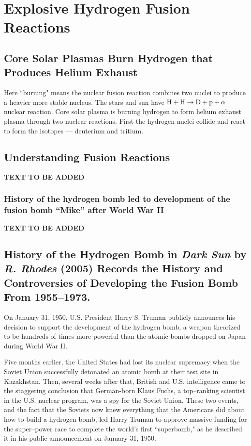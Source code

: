 \documentclass[a4paper,openany,12pt]{book}
\begin{document}
\chapter{Explosive Hydrogen Fusion Reactions}
\section{Core Solar Plasmas Burn Hydrogen that Produces Helium Exhaust}

Here ``burning" means the nuclear fusion reaction combines two nuclei to produce a heavier more stable nucleus. The stars and sun have $\rm H+H\to D+p+\alpha$ nuclear reaction. Core solar plasma is burning hydrogen to form helium exhaust plasma through two nuclear reactions. First the hydrogen nuclei collide and react to form the isotopes --- deuterium and tritium.
%
\section{Understanding Fusion Reactions}

\textbf{TEXT TO BE ADDED}

\subsection{History of the hydrogen bomb led to development of the fusion bomb ``Mike'' after World War II}

\textbf{TEXT TO BE ADDED}
%
\section[History of the Hydrogen Bomb in \emph{\textbf{Dark Sun}}]{History of the Hydrogen Bomb in \emph{\textbf{Dark Sun}} by \emph{\textbf{R. Rhodes}} (2005) Records the History and Controversies of Developing the Fusion Bomb From 1955--1973.}

On January 31, 1950, U.S. President Harry S. Truman publicly announces his decision to support the development of the hydrogen bomb, a weapon theorized to be hundreds of times more powerful than the atomic bombs dropped on Japan during World War II.

Five months earlier, the United States had lost its nuclear supremacy when the Soviet Union successfully detonated an atomic bomb at their test site in Kazakhstan. Then, several weeks after that, British and U.S. intelligence came to the staggering conclusion that German-born Klaus Fuchs, a top--ranking scientist in the U.S. nuclear program, was a spy for the Soviet Union. These two events, and the fact that the Soviets now knew everything that the Americans did about how to build a hydrogen bomb, led Harry Truman to approve massive funding for the super--power race to complete the world's first ``superbomb," as he described it in his public announcement on January 31, 1950.
\end{document}
